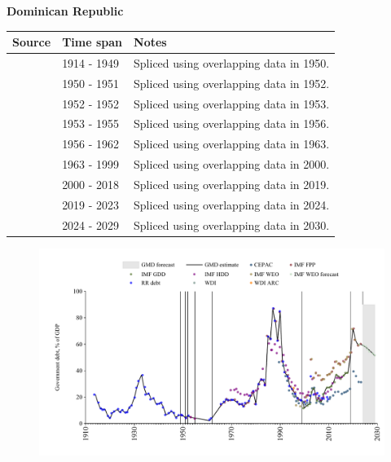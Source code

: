 \documentclass[12pt,a4paper,landscape]{article}
\begin{document}
\begin{adjustbox}{max totalsize={\paperwidth}{\paperheight},center}
\begin{minipage}[t][\textheight][t]{\textwidth}
\vspace*{0.5cm}
{}
\begin{center}
{\Large\bfseries Dominican Republic}
\end{center}
\vspace{0.5cm}
\begin{table}[H]
\centering
\small
\begin{tabular}{|l|l|l|}
\hline
\textbf{Source} & \textbf{Time span} & \textbf{Notes} \\
\hline
\rowcolor{white}\cite{RR_debt}& 1914 - 1949 &Spliced using overlapping data in 1950.\\
\rowcolor{lightgray}\cite{IMF_FPP}& 1950 - 1951 &Spliced using overlapping data in 1952.\\
\rowcolor{white}\cite{RR_debt}& 1952 - 1952 &Spliced using overlapping data in 1953.\\
\rowcolor{lightgray}\cite{IMF_FPP}& 1953 - 1955 &Spliced using overlapping data in 1956.\\
\rowcolor{white}\cite{RR_debt}& 1956 - 1962 &Spliced using overlapping data in 1963.\\
\rowcolor{lightgray}\cite{IMF_FPP}& 1963 - 1999 &Spliced using overlapping data in 2000.\\
\rowcolor{white}\cite{IMF_GDD}& 2000 - 2018 &Spliced using overlapping data in 2019.\\
\rowcolor{lightgray}\cite{IMF_FPP}& 2019 - 2023 &Spliced using overlapping data in 2024.\\
\rowcolor{white}\cite{IMF_WEO_forecast}& 2024 - 2029 &Spliced using overlapping data in 2030.\\
\hline
\end{tabular}
\end{table}
\begin{figure}[H]
\centering
\includegraphics[width=\textwidth,height=0.6\textheight,keepaspectratio]{graphs/DOM_govdebt_GDP.pdf}
\end{figure}
\end{minipage}
\end{adjustbox}
\end{document}
